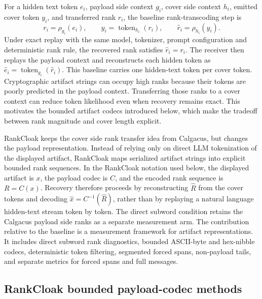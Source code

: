 \documentclass[fleqn,10pt]{wlscirep}
\begin{document}
For a hidden text token \(e_i\), payload side context \(g_i\), cover side context \(h_i\), emitted cover token \(y_i\), and transferred rank \(r_i\), the baseline rank-transcoding step is
\begin{equation}
r_i=\rho_{g_i}(e_i),
\qquad
y_i=\operatorname{token}_{h_i}(r_i),
\qquad
\hat r_i=\rho_{h_i}(y_i).
\label{eq:calgacus-rank-transcoding}
\end{equation}
Under exact replay with the same model, tokenizer, prompt configuration and deterministic rank rule, the recovered rank satisfies \(\hat r_i=r_i\). The receiver then replays the payload context and reconstructs each hidden token as \(\hat e_i=\operatorname{token}_{g_i}(\hat r_i)\). This baseline carries one hidden-text token per cover token. Cryptographic artifact strings can occupy high ranks because their tokens are poorly predicted in the payload context. Transferring those ranks to a cover context can reduce token likelihood even when recovery remains exact. This motivates the bounded artifact codecs introduced below, which make the tradeoff between rank magnitude and cover length explicit.

RankCloak keeps the cover side rank transfer idea from Calgacus, but changes the payload representation. Instead of relying only on direct LLM tokenization of the displayed artifact, RankCloak maps serialized artifact strings into explicit bounded rank sequences. In the RankCloak notation used below, the displayed artifact is \(x\), the payload codec is \(C\), and the encoded rank sequence is \(R=C(x)\). Recovery therefore proceeds by reconstructing \(\hat R\) from the cover tokens and decoding \(\hat{x}=C^{-1}(\hat R)\), rather than by replaying a natural language hidden-text stream token by token. The direct subword condition retains the Calgacus payload side ranks as a separate measurement arm. The contribution relative to the baseline is a measurement framework for artifact representations. It includes direct subword rank diagnostics, bounded ASCII-byte and hex-nibble codecs, deterministic token filtering, segmented forced spans, non-payload tails, and separate metrics for forced spans and full messages.

\subsection*{RankCloak bounded payload-codec methods}\label{sec:payload-method}
\end{document}
